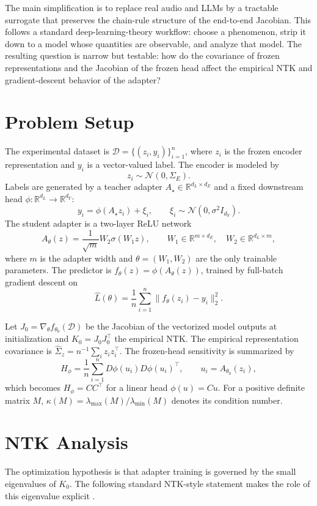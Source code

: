 \documentclass[10pt,a4paper]{article}
\begin{document}
The main simplification is to replace real audio and LLMs by a tractable surrogate that preserves the
chain-rule structure of the end-to-end Jacobian.  This follows a standard deep-learning-theory workflow:
choose a phenomenon, strip it down to a model whose quantities are observable, and analyze that model.
The resulting question is narrow but testable: how do the covariance of frozen representations and the
Jacobian of the frozen head affect the empirical NTK and gradient-descent behavior of the adapter?

\section{Problem Setup}
The experimental dataset is $\mathcal{D}=\{(z_i,y_i)\}_{i=1}^n$, where $z_i$ is the frozen encoder
representation and $y_i$ is a vector-valued label.  The encoder is modeled by
\[
    z_i\sim \mathcal{N}(0,\Sigma_E).
\]
Labels are generated by a teacher adapter $A_\star\in\mathbb{R}^{d_L\times d_E}$ and a fixed downstream
head $\phi:\mathbb{R}^{d_L}\to\mathbb{R}^{d_Y}$:
\[
    y_i=\phi(A_\star z_i)+\xi_i,\qquad \xi_i\sim\mathcal{N}(0,\sigma^2 I_{d_Y}).
\]
The student adapter is a two-layer ReLU network
\[
    A_\theta(z)=\frac{1}{\sqrt m}W_2\sigma(W_1z),\qquad
    W_1\in\mathbb{R}^{m\times d_E},\quad W_2\in\mathbb{R}^{d_L\times m},
\]
where $m$ is the adapter width and $\theta=(W_1,W_2)$ are the only trainable parameters.  The predictor
is $f_\theta(z)=\phi(A_\theta(z))$, trained by full-batch gradient descent on
\[
    \widehat L(\theta)=\frac1n\sum_{i=1}^n \|f_\theta(z_i)-y_i\|_2^2 .
\]

Let $J_0=\nabla_\theta f_{\theta_0}(\mathcal{D})$ be the Jacobian of the vectorized model outputs at
initialization and $K_0=J_0J_0^\top$ the empirical NTK.  The empirical representation covariance is
$\widehat\Sigma_z=n^{-1}\sum_i z_iz_i^\top$.  The frozen-head sensitivity is summarized by
\[
    H_\phi=\frac1n\sum_{i=1}^n D\phi(u_i)D\phi(u_i)^\top,
    \qquad u_i=A_{\theta_0}(z_i),
\]
which becomes $H_\phi=CC^\top$ for a linear head $\phi(u)=Cu$.  For a positive definite matrix $M$,
$\kappa(M)=\lambda_{\max}(M)/\lambda_{\min}(M)$ denotes its condition number.

\section{NTK Analysis}
The optimization hypothesis is that adapter training is governed by the small eigenvalues of $K_0$.
The following standard NTK-style statement makes the role of this eigenvalue explicit
\citep{jacot2018,du2019}.
\end{document}
